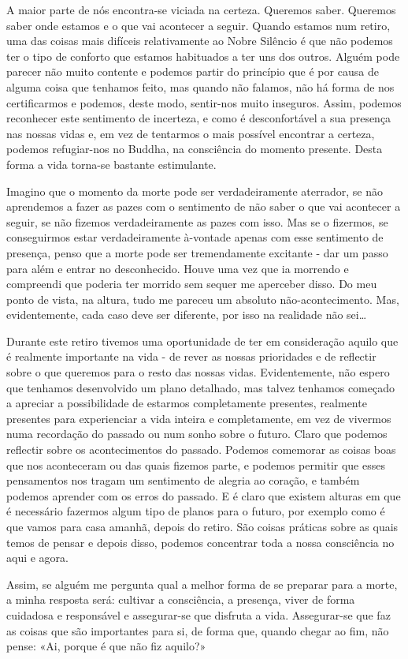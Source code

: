 A maior parte de nós encontra-se viciada na certeza. Queremos saber.
Queremos saber onde estamos e o que vai acontecer a seguir. Quando
estamos num retiro, uma das coisas mais difíceis relativamente ao Nobre
Silêncio é que não podemos ter o tipo de conforto que estamos habituados
a ter uns dos outros. Alguém pode parecer não muito contente e podemos
partir do princípio que é por causa de alguma coisa que tenhamos feito,
mas quando não falamos, não há forma de nos certificarmos e podemos,
deste modo, sentir-nos muito inseguros. Assim, podemos reconhecer este
sentimento de incerteza, e como é desconfortável a sua presença nas
nossas vidas e, em vez de tentarmos o mais possível encontrar a certeza,
podemos refugiar-nos no Buddha, na consciência do momento presente.
Desta forma a vida torna-se bastante estimulante.

Imagino que o momento da morte pode ser verdadeiramente aterrador, se
não aprendemos a fazer as pazes com o sentimento de não saber o que vai
acontecer a seguir, se não fizemos verdadeiramente as pazes com isso.
Mas se o fizermos, se conseguirmos estar verdadeiramente à-vontade
apenas com esse sentimento de presença, penso que a morte pode ser
tremendamente excitante - dar um passo para além e entrar no
desconhecido. Houve uma vez que ia morrendo e compreendi que poderia ter
morrido sem sequer me aperceber disso. Do meu ponto de vista, na altura,
tudo me pareceu um absoluto não-acontecimento. Mas, evidentemente, cada
caso deve ser diferente, por isso na realidade não sei\ldots{}

Durante este retiro tivemos uma oportunidade de ter em consideração
aquilo que é realmente importante na vida - de rever as nossas
prioridades e de reflectir sobre o que queremos para o resto das nossas
vidas. Evidentemente, não espero que tenhamos desenvolvido um plano
detalhado, mas talvez tenhamos começado a apreciar a possibilidade de
estarmos completamente presentes, realmente presentes para experienciar
a vida inteira e completamente, em vez de vivermos numa recordação do
passado ou num sonho sobre o futuro. Claro que podemos reflectir sobre
os acontecimentos do passado. Podemos comemorar as coisas boas que nos
aconteceram ou das quais fizemos parte, e podemos permitir que esses
pensamentos nos tragam um sentimento de alegria ao coração, e também
podemos aprender com os erros do passado. E é claro que existem alturas
em que é necessário fazermos algum tipo de planos para o futuro, por
exemplo como é que vamos para casa amanhã, depois do retiro. São coisas
práticas sobre as quais temos de pensar e depois disso, podemos
concentrar toda a nossa consciência no aqui e agora.

Assim, se alguém me pergunta qual a melhor forma de se preparar para a
morte, a minha resposta será: cultivar a consciência, a presença, viver
de forma cuidadosa e responsável e assegurar-se que disfruta a vida.
Assegurar-se que faz as coisas que são importantes para si, de forma
que, quando chegar ao fim, não pense: «Ai, porque é que não fiz aquilo?»

